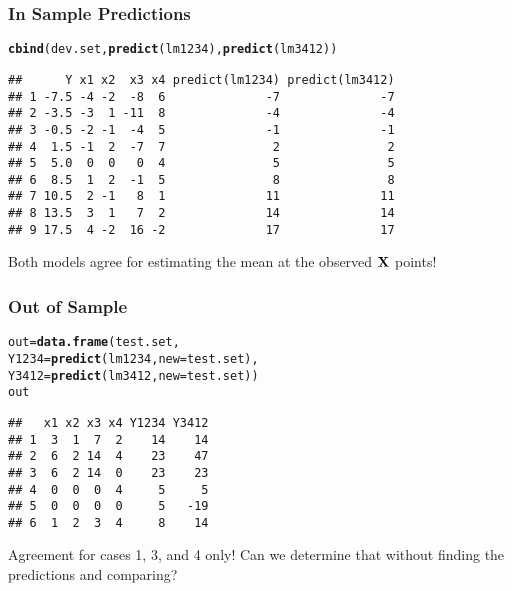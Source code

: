 \documentclass{beamer}\usepackage[]{graphicx}\usepackage[]{color}
\makeatletter
\newcommand{\hlstd}[1]{\textcolor[rgb]{0.345,0.345,0.345}{#1}}%
\newcommand{\hlkwb}[1]{\textcolor[rgb]{0.69,0.353,0.396}{#1}}%
\newcommand{\hlkwc}[1]{\textcolor[rgb]{0.333,0.667,0.333}{#1}}%
\newcommand{\hlkwd}[1]{\textcolor[rgb]{0.737,0.353,0.396}{\textbf{#1}}}%
\newenvironment{kframe}{%
 \def\at@end@of@kframe{}%
 \ifinner\ifhmode%
  \def\at@end@of@kframe{\end{minipage}}%
  \begin{minipage}{\columnwidth}%
 \fi\fi%
 \def\FrameCommand##1{\hskip\@totalleftmargin \hskip-\fboxsep
 \colorbox{shadecolor}{##1}\hskip-\fboxsep
     \hskip-\linewidth \hskip-\@totalleftmargin \hskip\columnwidth}%
 \MakeFramed {\advance\hsize-\width
   \@totalleftmargin\z@ \linewidth\hsize
   \@setminipage}}%
 {\par\unskip\endMakeFramed%
 \at@end@of@kframe}
\newenvironment{knitrout}{}{} %
\makeatother
\begin{document}
\begin{frame}[fragile] \frametitle{In Sample Predictions}

\begin{knitrout}
\color{fgcolor}\begin{kframe}
\begin{alltt}
\hlkwd{cbind}\hlstd{(dev.set,} \hlkwd{predict}\hlstd{(lm1234),} \hlkwd{predict}\hlstd{(lm3412))}
\end{alltt}
\begin{verbatim}
##      Y x1 x2  x3 x4 predict(lm1234) predict(lm3412)
## 1 -7.5 -4 -2  -8  6              -7              -7
## 2 -3.5 -3  1 -11  8              -4              -4
## 3 -0.5 -2 -1  -4  5              -1              -1
## 4  1.5 -1  2  -7  7               2               2
## 5  5.0  0  0   0  4               5               5
## 6  8.5  1  2  -1  5               8               8
## 7 10.5  2 -1   8  1              11              11
## 8 13.5  3  1   7  2              14              14
## 9 17.5  4 -2  16 -2              17              17
\end{verbatim}
\end{kframe}
\end{knitrout}

Both models agree for estimating the mean at the observed $\mathbf{X}$ points!
\end{frame}
\begin{frame} [fragile] \frametitle{Out of Sample}



\begin{knitrout}
\color{fgcolor}\begin{kframe}
\begin{alltt}
\hlstd{out} \hlkwb{=} \hlkwd{data.frame}\hlstd{(test.set,}
      \hlkwc{Y1234}\hlstd{=}\hlkwd{predict}\hlstd{(lm1234,} \hlkwc{new}\hlstd{=test.set),}
      \hlkwc{Y3412}\hlstd{=}\hlkwd{predict}\hlstd{(lm3412,} \hlkwc{new}\hlstd{=test.set))}
\hlstd{out}
\end{alltt}
\begin{verbatim}
##   x1 x2 x3 x4 Y1234 Y3412
## 1  3  1  7  2    14    14
## 2  6  2 14  4    23    47
## 3  6  2 14  0    23    23
## 4  0  0  0  4     5     5
## 5  0  0  0  0     5   -19
## 6  1  2  3  4     8    14
\end{verbatim}
\end{kframe}
\end{knitrout}

\pause
Agreement for cases 1, 3, and 4 only!  Can we determine that without
finding the predictions and comparing?
\end{frame}
\end{document}
